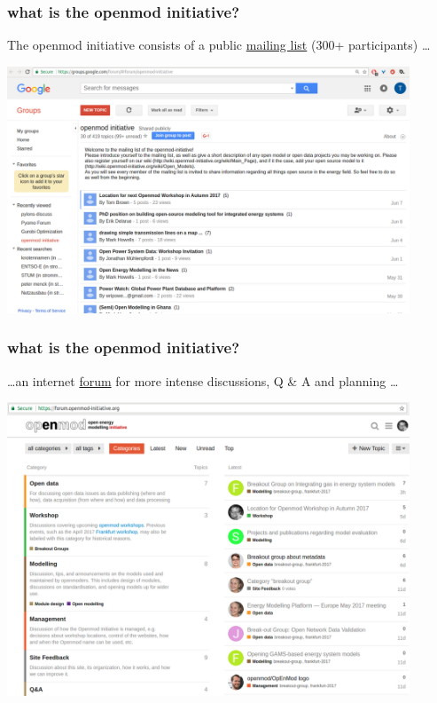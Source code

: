\documentclass[12pt,aspectratio=169]{beamer}
\begin{document}
\begin{frame}
  \frametitle{what is the openmod initiative?}

  The openmod initiative consists of a public \alert{\href{https://groups.google.com/forum/\#!forum/openmod-initiative}{mailing list}} (300+ participants) \dots

  \centering
  \includegraphics[width=12cm]{openmod-mailing_list}

\end{frame}

\begin{frame}
  \frametitle{what is the openmod initiative?}

  \dots an internet \alert{\href{https://forum.openmod-initiative.org/}{forum}} for more intense discussions, Q \& A and planning \dots

  \centering
  \includegraphics[width=12cm]{openmod-forum}

\end{frame}
\end{document}

